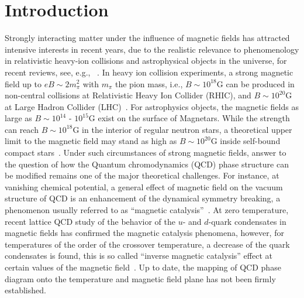 \documentclass[prd, showpacs,nofootinbib,amsmath,amssymb]{revtex4}
\begin{document}
\section{Introduction}
Strongly interacting matter under the influence of magnetic fields has attracted intensive interests
in recent years, due to the realistic relevance to phenomenology in relativistic heavy-ion collisions
and astrophysical objects in the universe, for recent reviews, see, e.g., ~\cite{andersen2016phase,kharzeev2013strongly}.
In heavy ion collision experiments, a strong magnetic field up to $eB \sim 2m_{\pi}^2$ with $m_{\pi}$
the pion mass, i.e., $B \sim 10^{18}\text{G}$ can be produced in non-central collisions at Relativistic Heavy
Ion Collider (RHIC), and $B \sim 10^{20}\text{G}$ at Large Hadron Collider (LHC)~\cite{kharzeev2008,skokov2009}.
For astrophysics objects, the magnetic fields as large as
$B \sim 10^{14}$ - $10^{15}\text{G}$ exist on the surface of Magnetars. While the strength
can reach $B \sim 10^{18}\text{G}$ in the interior of regular neutron stars, a theoretical upper limit to the magnetic field may stand as high as $B \sim 10^{20}\text{G}$ inside self-bound compact stars~\cite{dong2001,lai1991cold}.
Under such circumstances of strong magnetic fields,
answer to the question of how the Quantum chromodynamics (QCD) phase structure can be modified remains
one of the major theoretical challenges. For instance, at vanishing chemical potential, a general effect
of magnetic field on the vacuum structure of QCD is an enhancement of the dynamical symmetry breaking,
a phenomenon usually referred to as ``magnetic catalysis''~\cite{miransky2015quantum}. At zero
temperature, recent lattice QCD study of the behavior of the $u$- and $d$-quark condensates in
magnetic fields has confirmed the magnetic catalysis phenomena, however, for temperatures of the order of
the crossover temperature, a decrease of the quark condensates is found, this is so called ``inverse
magnetic catalysis'' effect at certain values of the magnetic
field~\cite{bali2012,miransky2002,fukushima2012}.
Up to date, the mapping of QCD phase diagram onto the temperature and 
magnetic field plane has not been firmly established.
\end{document}
